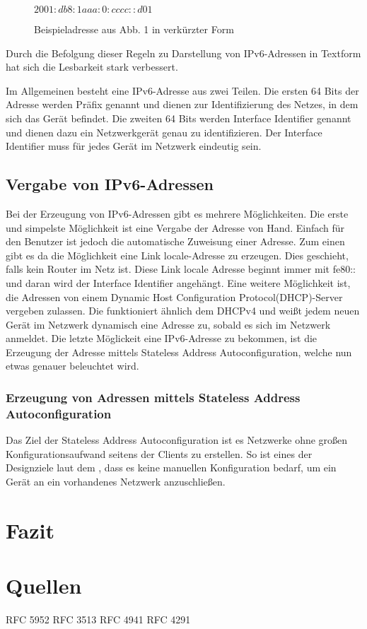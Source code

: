 \documentclass[a4paper, 12pt]{scrartcl}
\begin{document}
\begin{figure}[h]
	\centering
	$2001:db8:1aaa:0:cccc::d01$
	\caption{Beispieladresse aus Abb. 1 in verkürzter Form}
\end{figure}

Durch die Befolgung dieser Regeln zu Darstellung von IPv6-Adressen in Textform hat sich die Lesbarkeit stark verbessert.

Im Allgemeinen besteht eine IPv6-Adresse aus zwei Teilen. Die ersten 64 Bits der Adresse werden Präfix genannt und dienen zur Identifizierung des Netzes, in dem sich das Gerät befindet. 
Die zweiten 64 Bits werden Interface Identifier genannt und dienen dazu ein Netzwerkgerät genau zu identifizieren. Der Interface Identifier muss für jedes Gerät im Netzwerk eindeutig sein.
\newpage
\subsection{Vergabe von IPv6-Adressen}
Bei der Erzeugung von IPv6-Adressen gibt es mehrere Möglichkeiten. Die erste und simpelste Möglichkeit ist eine Vergabe der Adresse von Hand. Einfach für den Benutzer ist jedoch die automatische Zuweisung einer Adresse. Zum einen gibt es da die Möglichkeit eine Link locale-Adresse zu erzeugen. Dies geschieht, falls kein Router im Netz ist. Diese Link locale Adresse beginnt immer mit fe80:: und daran wird der Interface Identifier angehängt. Eine weitere Möglichkeit ist, die Adressen von einem Dynamic Host Configuration Protocol(DHCP)-Server vergeben zulassen. Die funktioniert ähnlich dem DHCPv4 und weißt jedem neuen Gerät im Netzwerk dynamisch eine Adresse zu, sobald es sich im Netzwerk anmeldet.
Die letzte Möglickeit eine IPv6-Adresse zu bekommen, ist die Erzeugung der Adresse mittels Stateless Address Autoconfiguration, welche nun etwas genauer beleuchtet wird.
\subsubsection{Erzeugung von Adressen mittels Stateless Address Autoconfiguration}
Das Ziel der Stateless Address Autoconfiguration ist es Netzwerke ohne großen Konfigurationsaufwand seitens der Clients zu erstellen. So ist eines der Designziele laut dem \cite{rfc4862} , dass es keine manuellen Konfiguration bedarf, um ein Gerät an ein vorhandenes Netzwerk anzuschließen.

\section{Fazit}
\newpage

\section{Quellen}
RFC 5952
RFC 3513
RFC 4941
RFC 4291
{}


\end{document}
